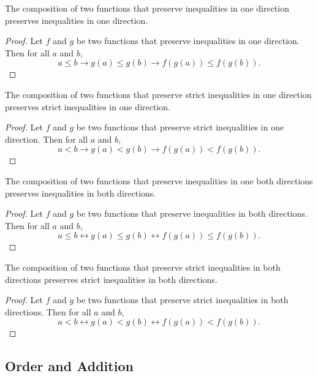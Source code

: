 \documentclass[../math.tex]{subfiles}
\begin{document}
\begin{instance}
    The composition of two functions that preserve inequalities in one direction
    preserves inequalities in one direction.
\end{instance}
\begin{proof}
    Let $f$ and $g$ be two functions that preserve inequalities in one
    direction.  Then for all $a$ and $b$,
    \[
        a \leq b \to g(a) \leq g(b) \to f(g(a)) \leq f(g(b)).
    \]
\end{proof}

\begin{instance}
    The composition of two functions that preserve strict inequalities in one
    direction preserves strict inequalities in one direction.
\end{instance}
\begin{proof}
    Let $f$ and $g$ be two functions that preserve strict inequalities in one
    direction.  Then for all $a$ and $b$,
    \[
        a < b \to g(a) < g(b) \to f(g(a)) < f(g(b)).
    \]
\end{proof}

\begin{instance}
    The composition of two functions that preserve inequalities in one both
    directions preserves inequalities in both directions.
\end{instance}
\begin{proof}
    Let $f$ and $g$ be two functions that preserve inequalities in both
    directions.  Then for all $a$ and $b$,
    \[
        a \leq b \leftrightarrow g(a) \leq g(b) \leftrightarrow f(g(a)) \leq
        f(g(b)).
    \]
\end{proof}

\begin{instance}
    The composition of two functions that preserve strict inequalities in both
    directions preserves strict inequalities in both directions.
\end{instance}
\begin{proof}
    Let $f$ and $g$ be two functions that preserve strict inequalities in both
    directions.  Then for all $a$ and $b$,
    \[
        a < b \leftrightarrow g(a) < g(b) \leftrightarrow f(g(a)) < f(g(b)).
    \]
\end{proof}

\subsection{Order and Addition}
\end{document}
